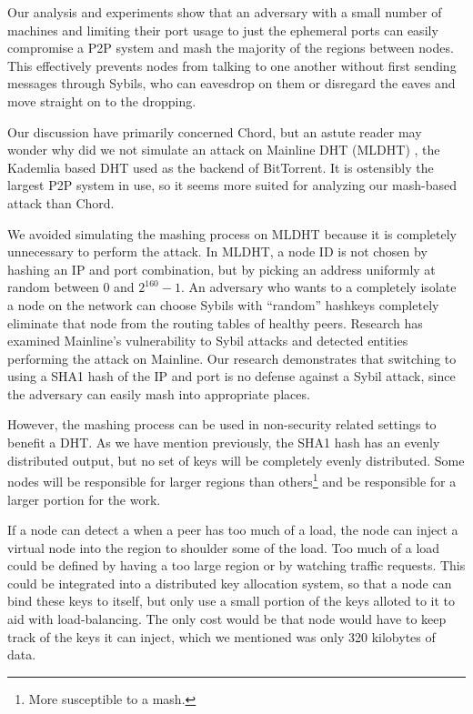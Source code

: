 \documentclass[a4paper]{article}
\begin{document}
Our analysis and experiments show that an adversary with a small number of machines and limiting their port usage to just the ephemeral ports can easily compromise a P2P system and mash the majority of the regions between nodes.
This effectively prevents nodes from talking to one another without first sending messages through Sybils, who can eavesdrop on them or disregard the eaves and move straight on to the dropping.

Our discussion have primarily concerned Chord, but an astute reader may wonder why did we not simulate an attack on Mainline DHT (MLDHT) \cite{mainline}, the Kademlia \cite{kademlia} based DHT used as the backend of BitTorrent.
It is ostensibly the largest P2P system in use, so it seems more suited for analyzing our mash-based attack than Chord.

We avoided simulating the mashing process on MLDHT because it is completely unnecessary to perform the attack.
In MLDHT, a node ID is not chosen by hashing an IP and port combination, but by picking an address uniformly at random between 0 and $2^{160}-1$.
An adversary who wants to a completely isolate a node on the network can choose Sybils with ``random'' hashkeys completely eliminate that node from the routing tables of healthy peers. 
Research has examined Mainline's vulnerability to Sybil attacks\cite{sybilbit} and detected entities performing the attack on Mainline.
Our research demonstrates that switching to using a SHA1 hash of the IP and port is no defense against a Sybil attack, since the adversary can easily mash into appropriate places.

However, the mashing process can be used in non-security related settings to benefit a DHT.
As we have mention previously, the SHA1 hash has an evenly distributed output, but no set of keys will be completely evenly distributed.
Some nodes will be responsible for larger regions than others\footnote{More susceptible to a mash.} and be responsible for a larger portion for the work.

If a node can detect a when a peer has too much of a load, the node can inject a virtual node into the region to shoulder some of the load.
Too much of a load could be defined by having a too large region or by watching traffic requests.
This could be integrated into a distributed key allocation system, so that a node can bind these keys to itself, but only use a small portion of the keys alloted to it to aid with load-balancing.
The only cost would be that node would have to keep track of the keys it can inject, which we mentioned was only 320 kilobytes of data.




\end{document}
